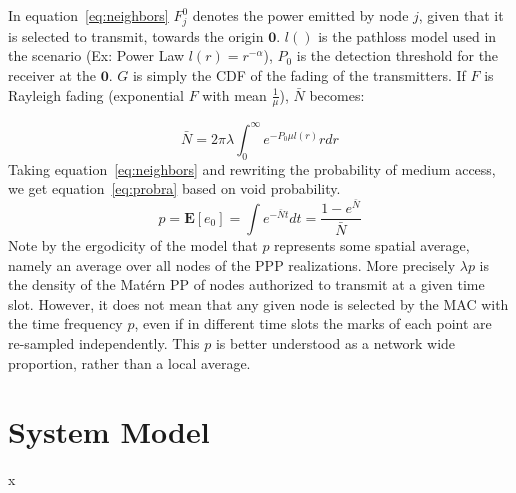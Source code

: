 \documentclass[a4paper]{article}
\begin{document}
%
In equation~\eqref{eq:neighbors} $F_j^0$ denotes the power emitted by node $j$, given that it is selected to transmit, towards the origin $\textbf{0}$.  $l()$ is the pathloss model used in the scenario (Ex: Power Law $l(r)=r^{-\alpha}$),  $P_0$ is the detection threshold for the receiver at the $\textbf{0}$.  $G$ is simply the CDF of the fading of the transmitters.  If $F$ is Rayleigh fading (exponential $F$ with mean $\frac{1}{\mu}$), $\bar{N}$ becomes:\par
%
\begin{equation}
  \bar{N} = 2 \pi \lambda \int_0^\infty  e^{-P_0 \mu l(r)} r dr
\end{equation}
%
Taking equation~\eqref{eq:neighbors} and rewriting the probability of medium access, we get equation~\eqref{eq:probra} based on void probability.
%
\begin{equation}\label{eq:probra}
  p = \textbf{E}[e_0] = \int e^{-\bar{N}t} dt= \frac{1-e^{\bar{N}}}{\bar{N}}
\end{equation}
%
Note by the ergodicity of the model that $p$ represents some spatial average, namely an average over all nodes of the PPP realizations. More precisely $\lambda p$ is the density of the Mat\'ern PP of nodes authorized to transmit at a given time slot. However, it does not mean that any given
node is selected by the MAC with the time frequency $p$, even if in different time slots the marks of each point are re-sampled independently.  This $p$ is better understood as a network wide proportion, rather than a local average.



\section{System Model}
x


\end{document}
